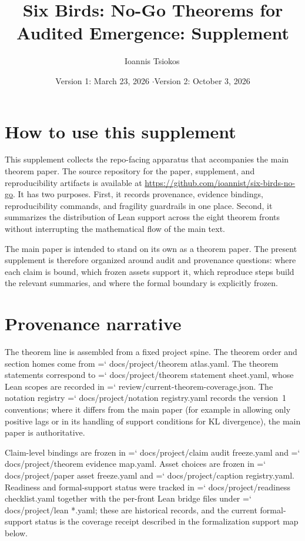 \documentclass[11pt]{article}
\title{Six Birds: No-Go Theorems for Audited Emergence: Supplement}
\author{Ioannis Tsiokos\,\orcidlink{0009-0009-7659-5964}}
\date{Version 1: March 23, 2026 \quad$\cdot$\quad Version 2: October 3, 2026}
\renewcommand{\texttt}[1]{{\ttfamily\hyphenchar\font=`\-\relax
   \def\_{\textunderscore\penalty50 }\def\/{\char`\/\penalty50 }#1}}
\begin{document}
\maketitle
\section*{How to use this supplement}
This supplement collects the repo-facing apparatus that accompanies the main theorem paper.
The source repository for the paper, supplement, and reproducibility artifacts is available at \url{https://github.com/ioannist/six-birds-no-go}.
It has two purposes.
First, it records provenance, evidence bindings, reproducibility commands, and fragility guardrails in one place.
Second, it summarizes the distribution of Lean support across the eight theorem fronts without interrupting the mathematical flow of the main text.

The main paper is intended to stand on its own as a theorem paper.
The present supplement is therefore organized around audit and provenance questions: where each claim is bound, which frozen assets support it, which reproduce steps build the relevant summaries, and where the formal boundary is explicitly frozen.
 \section{Provenance narrative}
The theorem line is assembled from a fixed project spine.
The theorem order and section homes come from \texttt{docs/project/theorem\_atlas.yaml}.
The theorem statements correspond to \texttt{docs/project/theorem\_statement\_sheet.yaml}, whose Lean scopes are recorded in \texttt{review/current-theorem-coverage.json}.
The notation registry \texttt{docs/project/notation\_registry.yaml} records the version~1 conventions; where it differs from the main paper (for example in allowing only positive lags or in its handling of support conditions for KL divergence), the main paper is authoritative.

Claim-level bindings are frozen in \texttt{docs/project/claim\_audit\_freeze.yaml} and \texttt{docs/project/theorem\_evidence\_map.yaml}.
Asset choices are frozen in \texttt{docs/project/paper\_asset\_freeze.yaml} and \texttt{docs/project/caption\_registry.yaml}.
Readiness and formal-support status were tracked in \texttt{docs/project/readiness\_checklist.yaml} together with the per-front Lean bridge files under \texttt{docs/project/lean\_*.yaml}; these are historical records, and the current formal-support status is the coverage receipt described in the formalization support map below.
\end{document}
